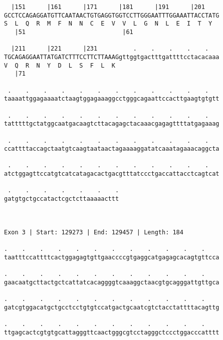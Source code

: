 \documentclass{article}
\begin{document}
\begin{Verbatim}
  |151      |161      |171      |181      |191      |201    
GCCTCCAGAGGATGTTCAATAACTGTGAGGTGGTCCTTGGGAATTTGGAAATTACCTATG
S  L  Q  R  M  F  N  N  C  E  V  V  L  G  N  L  E  I  T  Y  
   |51                           |61                        
  
  |211      |221      |231          .    .    .    .    .   
TGCAGAGGAATTATGATCTTTCCTTCTTAAAGgttggtgactttgattttcctacacaaa
V  Q  R  N  Y  D  L  S  F  L  K                             
   |71                                                      
  
 .    .    .    .    .    .    .    .    .    .    .    .   
taaaattggagaaaatctaagtggagaaaggcctgggcagaattccacttgaagtgtgtt
                                                            
 .    .    .    .    .    .    .    .    .    .    .    .   
tatttttgctatggcaatgacaagtcttacagagctacaaacgagagttttatgagaaag
                                                            
 .    .    .    .    .    .    .    .    .    .    .    .   
ccattttaccagctaatgtcaagtaataactagaaaaggatatcaaatagaaacaggcta
                                                            
 .    .    .    .    .    .    .    .    .    .    .    .   
atctggagttccatgtcatcatagacactgacgtttatccctgaccattacctcagtcat
                                                            
 .    .    .    .    .    .    .
gatgtgctgccatactcgctcttaaaaacttt
                                
                                
 
Exon 3 | Start: 129273 | End: 129457 | Length: 184
 
.    .    .    .    .    .    .    .    .    .    .    .    
taatttccattttcactggagagtgttgaaccccgtgaggcatgagagcacagtgttcca
                                                            
.    .    .    .    .    .    .    .    .    .    .    .    
gaacaatgcttactgctcattatcacaggggtcaaaggctaacgtgcagggattgttgca
                                                            
.    .    .    .    .    .    .    .    .    .    .    .    
gatcgtggacatgctgcctcctgtgtccatgactgcaatcgtctacctattttacagttg
                                                            
.    .    .    .    .    .    .    .    .    .    .    .    
ttgagcactcgtgtgcattagggttcaactgggcgtcctagggctccctggacccatttt
                                                            

\end{Verbatim}
\end{document}

